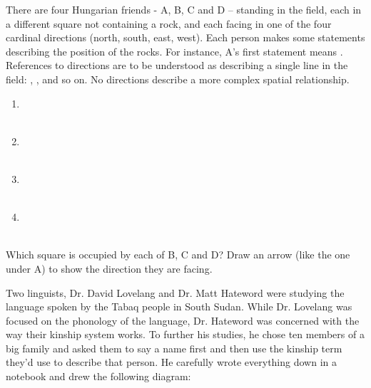 \begin{refsection}
\begin{problem}{\langnameHungarian}{\nameAHesterberg}{}
There are four Hungarian friends - A, B, C and D – standing in the field, each in a different square not containing a rock, and each facing in one of the four cardinal directions (north, south, east, west). Each person makes some statements describing the position of the rocks. For instance, A's first statement means . References to directions are to be understood as describing a single line in the field: , , and so on. No directions describe a more complex spatial relationship.

\begin{multicols}{2}
\begin{enumerate}[leftmargin = 0.5in, label = \Alph* says:]
    \item {}\\ \\ 
    \item {} \\  \\ 
    \item {} \\  \\ 
    \item {} \\  \\ 
\end{enumerate}
\end{multicols}
\begin{assgts}
\item Which square is occupied by each of B, C and D? Draw an arrow (like the one under A) to show the direction they are facing.
\end{assgts}
\end{problem}

\begin{problem}{\langnameTabaq}{\nameDMirea}{}
Two linguists, Dr. David Lovelang and Dr. Matt Hateword were studying the language spoken by the Tabaq people in South Sudan. While Dr. Lovelang was focused on the phonology of the language, Dr. Hateword was concerned with the way their kinship system works. To further his studies, he chose ten members of a big family and asked them to say a name first and then use the kinship term they'd use to describe that person. He carefully wrote everything down in a notebook and drew the following diagram:\largerpage[3]


\end{problem}
\end{refsection}
